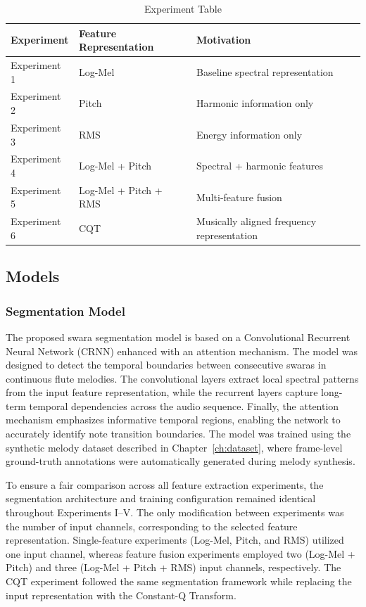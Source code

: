 \begin{table}[H]
\centering
\caption{Experiment Table}
\label{tab:experiment-table}
\begin{tabular}{lll}
\toprule
\textbf{Experiment} & \textbf{Feature Representation} & \textbf{Motivation} \\
\midrule
Experiment 1 & Log-Mel & Baseline spectral representation \\
Experiment 2 & Pitch & Harmonic information only \\
Experiment 3 & RMS & Energy information only \\
Experiment 4 & Log-Mel + Pitch & Spectral + harmonic features \\
Experiment 5 & Log-Mel + Pitch + RMS & Multi-feature fusion \\
Experiment 6 & CQT & Musically aligned frequency representation \\
\bottomrule
\end{tabular}
\end{table}

\subsection{Models}

\subsubsection*{Segmentation Model}

The proposed swara segmentation model is based on a Convolutional Recurrent Neural Network (CRNN) enhanced with an attention mechanism. The model was designed to detect the temporal boundaries between consecutive swaras in continuous flute melodies. The convolutional layers extract local spectral patterns from the input feature representation, while the recurrent layers capture long-term temporal dependencies across the audio sequence. Finally, the attention mechanism emphasizes informative temporal regions, enabling the network to accurately identify note transition boundaries. The model was trained using the synthetic melody dataset described in Chapter~\ref{ch:dataset}, where frame-level ground-truth annotations were automatically generated during melody synthesis.

To ensure a fair comparison across all feature extraction experiments, the segmentation architecture and training configuration remained identical throughout Experiments I--V. The only modification between experiments was the number of input channels, corresponding to the selected feature representation. Single-feature experiments (Log-Mel, Pitch, and RMS) utilized one input channel, whereas feature fusion experiments employed two (Log-Mel + Pitch) and three (Log-Mel + Pitch + RMS) input channels, respectively. The CQT experiment followed the same segmentation framework while replacing the input representation with the Constant-Q Transform.

